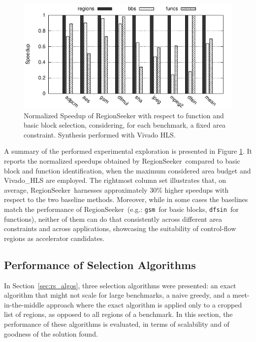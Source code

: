 \documentclass[]{usiinfthesis}
\newcommand{\rseeker}{{RegionSeeker}}
\newcommand{\dfsin}{\texttt{dfsin}}
\newcommand{\gsm}{\texttt{gsm}}
\begin{document}
\begin{figure}[h]
\centering
\includegraphics[width= 0.8 \linewidth]{figs/rbf_max_norm_all}
\caption{Normalized Speedup of RegionSeeker with respect to function and basic block selection, 
considering, for each benchmark, a fixed area constraint. Synthesis performed with Vivado HLS.}
\label{fig:regions_all}
\end{figure}

A summary of the performed experimental exploration is presented in
Figure \ref{fig:regions_all}.  It reports the normalized speedups
obtained by \rseeker\ compared to basic block and function
identification, when the maximum considered area budget and
Vivado\_HLS are employed.  The rightmost column set illustrates that,
on average, \rseeker\ harnesses approximately 30\% higher speedups
with respect to the two baseline methods. Moreover, while in some
cases the baselines match the performance of \rseeker\ (e.g.: \gsm\
for basic blocks, \dfsin\ for functions), neither of them can do that
consistently across different area constraints and across
applications, showcasing the suitability of control-flow regions as
accelerator candidates.

\subsection{Performance of Selection Algorithms}
\label{subsec:algo-perf}

In Section~\ref{sec:rs_algos}, three selection algorithms were presented:
an exact algorithm that might not scale for large benchmarks, a naive
greedy, and a meet-in-the-middle approach where the exact algorithm is
applied only to a cropped list of regions, as opposed to all regions
of a benchmark. In this section, the performance of these algorithms
is evaluated, in terms of scalability and of goodness of the solution
found.\par
\end{document}
